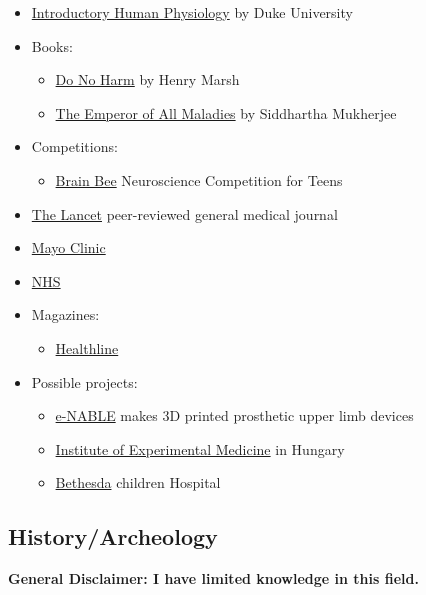 \documentclass{article}
\begin{document}
\begin{itemize}
    \item \href{https://www.coursera.org/learn/physiology}{Introductory Human Physiology} by Duke University
    \item Books:
    \begin{itemize}
        \item \href{https://www.goodreads.com/book/show/21086818-do-no-harm}{Do No Harm} by Henry Marsh
        \item \href{https://www.goodreads.com/book/show/7170627-the-emperor-of-all-maladies}{The Emperor of All Maladies} by Siddhartha Mukherjee
    \end{itemize}
    \item Competitions:
    \begin{itemize}
        \item \href{https://thebrainbee.org/}{Brain Bee} Neuroscience Competition for Teens
    \end{itemize}
    \item \href{https://www.thelancet.com/}{The Lancet} peer-reviewed general medical journal
    \item \href{https://www.mayoclinic.org/}{Mayo Clinic}
    \item \href{https://www.nhs.uk/}{NHS} 
    \item Magazines:
    \begin{itemize}
        \item \href{https://www.healthline.com/}{Healthline}
    \end{itemize}
    \item Possible projects:
    \begin{itemize}
        \item \href{https://enablingthefuture.org/}{e-NABLE} makes 3D printed prosthetic upper limb devices
        \item \href{https://koki.hun-ren.hu/?lang=en}{Institute of Experimental Medicine} in Hungary
        \item \href{https://www.bethesda.hu/about-us/}{Bethesda} children Hospital
    \end{itemize}
\end{itemize}

\subsection{History/Archeology}
\textbf{General Disclaimer: I have limited knowledge in this field.}
\end{document}
